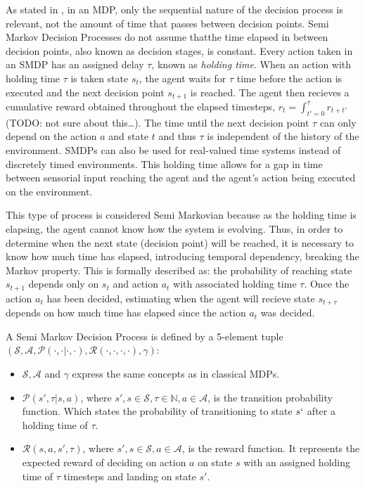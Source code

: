 \documentclass{../main.tex}{}
\begin{document}
As stated in \citep{Barto2003}, in an MDP, only the sequential nature of the decision process is relevant, not the amount of time that passes between decision points. Semi Markov Decision Processes do not assume thatthe time elapsed in between decision points, also known as decision stages, is constant. Every action taken in an SMDP has an assigned delay $\tau$, known as \textit{holding time}. When an action with holding time $\tau$ is taken state $s_t$, the agent waits for $\tau$ time before the action is executed and the next decision point $s_{t+1}$ is reached. The agent then recieves a cumulative reward obtained throughout the elapsed timesteps, $r_t = \int_{t'=0}^{\tau}r_{t+t'}$(TODO: not sure about this\ldots). The time until the next decision point $\tau$ can only depend on the action $a$ and state $t$ and thus $\tau$ is independent of the history of the environment. SMDPs can also be used for real-valued time systems instead of discretely timed environments. This holding time allows for a gap in time between sensorial input reaching the agent and the agent's action being executed on the environment. %

This type of process is considered Semi Markovian because as the holding time is elapsing, the agent cannot know how the system is evolving. Thus, in order to determine when the next state (decision point) will be reached, it is necessary to know how much time has elapsed, introducing temporal dependency, breaking the Markov property. This is formally described as: the probability of reaching state $s_{t+1}$ depends only on $s_t$ and action $a_t$ with associated holding time $\tau$. Once the action $a_t$ has been decided, estimating when the agent will recieve state $s_{t+\tau}$ depends on how much time has elapsed since the action $a_t$ was decided.

A Semi Markov Decision Process is defined by a 5-element tuple $(\mathcal{S}, \mathcal{A}, \mathcal{P}(\cdot, \cdot | \cdot, \cdot), \mathcal{R}(\cdot, \cdot, \cdot, \cdot), \gamma)$:
\begin{itemize}
    \item $\mathcal{S}, \mathcal{A}$ and $\gamma$ express the same concepts as in classical MDPs.
    \item $\mathcal{P}(s', \tau | s, a)$, where $s',s \in \mathcal{S}, \tau \in \mathbb{N}, a \in \mathcal{A}$, is the transition probability function. Which states the probability of transitioning to state $s`$ after a holding time of $\tau$.
    \item $\mathcal{R}(s, a, s', \tau)$, where $s',s \in \mathcal{S}, a \in \mathcal{A}$, is the reward function. It represents the expected reward of deciding on action $a$ on state $s$ with an assigned holding time of $\tau$ timesteps and landing on state $s'$.
\end{itemize}
\end{document}
